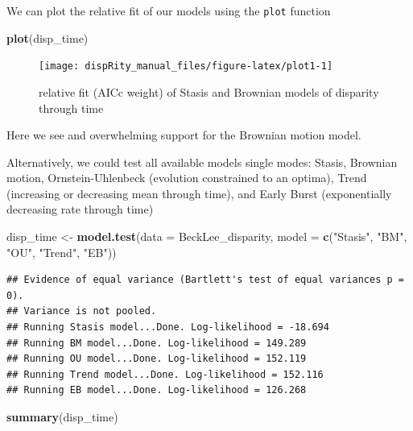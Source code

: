 \documentclass[
]{book}
\newenvironment{Shaded}{\begin{snugshade}}{\end{snugshade}}
\newcommand{\DataTypeTok}[1]{\textcolor[rgb]{0.13,0.29,0.53}{#1}}
\newcommand{\KeywordTok}[1]{\textcolor[rgb]{0.13,0.29,0.53}{\textbf{#1}}}
\newcommand{\NormalTok}[1]{#1}
\newcommand{\StringTok}[1]{\textcolor[rgb]{0.31,0.60,0.02}{#1}}
\begin{document}
We can plot the relative fit of our models using the \texttt{plot} function

\begin{Shaded}
\begin{Highlighting}[]
\KeywordTok{plot}\NormalTok{(disp\_time)}
\end{Highlighting}
\end{Shaded}

\begin{figure}

{\centering \texttt{[image: dispRity\_manual\_files/figure-latex/plot1-1]} 

}

\caption{relative fit (AICc weight) of Stasis and Brownian models of disparity through time}\label{fig:plot1}
\end{figure}

Here we see and overwhelming support for the Brownian motion model.

Alternatively, we could test all available models single modes: Stasis, Brownian motion, Ornstein-Uhlenbeck (evolution constrained to an optima), Trend (increasing or decreasing mean through time), and Early Burst (exponentially decreasing rate through time)

\begin{Shaded}
\begin{Highlighting}[]
\NormalTok{disp\_time \textless{}{-}}\StringTok{ }\KeywordTok{model.test}\NormalTok{(}\DataTypeTok{data =}\NormalTok{ BeckLee\_disparity,}
                  \DataTypeTok{model =} \KeywordTok{c}\NormalTok{(}\StringTok{"Stasis"}\NormalTok{, }\StringTok{"BM"}\NormalTok{, }\StringTok{"OU"}\NormalTok{, }\StringTok{"Trend"}\NormalTok{, }\StringTok{"EB"}\NormalTok{))}
\end{Highlighting}
\end{Shaded}

\begin{verbatim}
## Evidence of equal variance (Bartlett's test of equal variances p = 0).
## Variance is not pooled.
## Running Stasis model...Done. Log-likelihood = -18.694
## Running BM model...Done. Log-likelihood = 149.289
## Running OU model...Done. Log-likelihood = 152.119
## Running Trend model...Done. Log-likelihood = 152.116
## Running EB model...Done. Log-likelihood = 126.268
\end{verbatim}

\begin{Shaded}
\begin{Highlighting}[]
\KeywordTok{summary}\NormalTok{(disp\_time)}
\end{Highlighting}
\end{Shaded}
\end{document}
